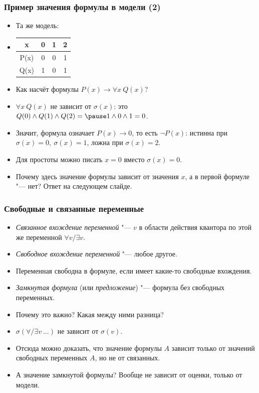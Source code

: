 \documentclass[10pt]{beamer}
\begin{document}
\begin{frame}
    \frametitle{Пример значения формулы в модели (2)}
    \begin{itemize}
        \item Та же модель:
        \item[] \begin{tabular}{c | c c c}
            x & 0 & 1 & 2 \\ \hline
            P(x) & 0 & 0 & 1 \\
            Q(x) & 1 & 0 & 1
        \end{tabular}
        \item Как насчёт формулы $P(x) \to \forall x ~ Q(x)$? \pause
        \item $\forall x ~ Q(x)$ не зависит от $\sigma(x)$: это $Q(0) \land Q(1) \land Q(2) = \pause 1 \land 0 \land 1 = 0$.
        \item Значит, формула означает $P(x) \to 0$, то есть $\neg P(x)$: \pause истинна при $\sigma(x) = 0,~\sigma(x) = 1$, ложна при $\sigma(x) = 2$.
        \item Для простоты можно писать $x = 0$ вместо $\sigma(x) = 0$. \pause
        \item Почему здесь значение формулы зависит от значения $x$, а в первой формуле "--- нет? Ответ на следующем слайде.
    \end{itemize}
\end{frame}

\begin{frame}
    \frametitle{Свободные и связанные переменные}
    \begin{itemize}
        \item \emph{Связанное вхождение переменной} "--- \pause $v$ в области действия квантора по этой же переменной $\forall v/\exists v$.
        \item \emph{Свободное вхождение переменной} "--- \pause любое другое.
        \item Переменная свободна в формуле, если имеет какие-то свободные вхождения.
        \item \emph{Замкнутая формула} (или \emph{предложение}) "--- формула без свободных переменных.
        \item Почему это важно? Какая между ними разница? \pause 
        \item $\sigma(\forall/\exists v ~ \ldots)$ не зависит от $\sigma(v)$.
        \pause
        \item Отсюда можно доказать, что значение формулы $A$ зависит только от значений свободных переменных $A$, но не от связанных.
        \pause
        \item А значение замкнутой формулы? \pause Вообще не зависит от оценки, только от модели.
    \end{itemize}
\end{frame}
\end{document}
